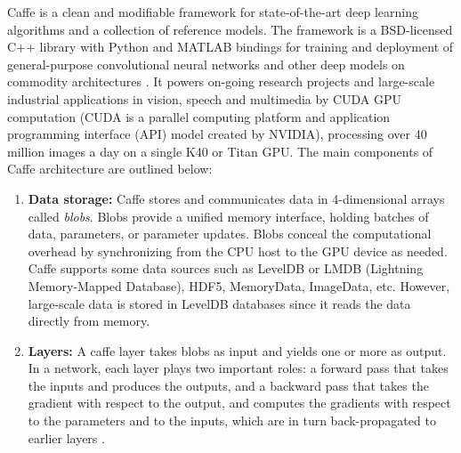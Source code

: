 Caffe is a clean and modifiable framework for state-of-the-art deep learning algorithms and a collection of reference models. The framework is a BSD-licensed C++ library with Python and MATLAB bindings for training and deployment of general-purpose convolutional neural networks and other deep models on commodity architectures . It powers on-going research projects and large-scale industrial applications in vision, speech and multimedia by CUDA GPU computation (CUDA is a parallel computing platform and application programming interface (API) model created by NVIDIA\cite{cuda}), processing over 40 million images a day on a single K40 or Titan GPU\cite{jia2014caffe}. 
The main components of Caffe architecture are outlined below:
\begin{enumerate}

\item \textbf{Data storage:} Caffe stores and communicates data in 4-dimensional arrays called \textit{blobs}. Blobs provide a unified memory interface, holding batches of data, parameters, or parameter updates. Blobs conceal the computational overhead by synchronizing from the CPU host to the GPU device as needed. Caffe supports some data sources such as LevelDB or LMDB (Lightning Memory-Mapped Database), HDF5, MemoryData, ImageData, etc. However, large-scale data is stored in LevelDB databases since it reads the data directly from memory\cite{caffe}. 
\item \textbf{Layers:} A caffe layer takes blobs as input and yields one or more as output. In a network, each layer plays two important roles: a forward pass that takes the inputs and produces the outputs, and a backward pass that takes the gradient with respect to the output, and computes the gradients with respect to the parameters and to the inputs, which are in turn back-propagated to earlier layers \cite{jia2014caffe}.


\end{enumerate}
